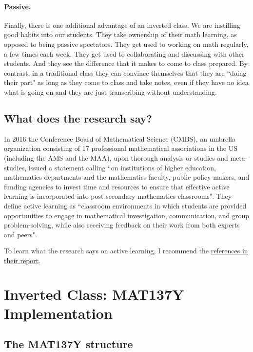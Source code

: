 \documentclass[11pt]{article}
\begin{document}
\paragraph{Passive.}  Finally, there is one additional advantage of an inverted class.  We are instilling good habits into our students.  They take ownership of their math learning, as opposed to being passive spectators.  They get used to working on math regularly, a few times each week.   They get used to collaborating and discussing with other students.   And they see the difference that it makes to come to class prepared.  By contrast, in a traditional class they can convince themselves that they are ``doing their part" as long as they come to class and take notes, even if they have no idea what is going on and they are just transcribing without understanding.

\subsection{What does the research say?}
{\baselineskip
In 2016 the Conference Board of Mathematical Science (CMBS), an umbrella organization consisting of 17 professional mathematical associations in the US (including the AMS and the MAA), upon thorough analysis or studies and meta-studies, issued a statement calling {``on institutions of higher education, mathematics departments and the mathematics faculty, public policy-makers, and funding agencies to invest time and resources to ensure that effective active learning is incorporated into post-secondary mathematics classrooms"}.    They define active learning as ``classroom environments in which students are provided opportunities to engage in mathematical investigation, communication, and group problem-solving, while also receiving feedback on their work from both experts and peers".  

To learn what the research says on active learning, I recommend the \href{https://www.cbmsweb.org/2016/07/active-learning-in-post-secondary-mathematics-education/}{references in their report}.
}


\newpage

\section[2. Inverted Class: MAT137Y Implementation]{Inverted Class: MAT137Y Implementation}

\subsection{The MAT137Y structure} \label{sec:structure}
\end{document}
